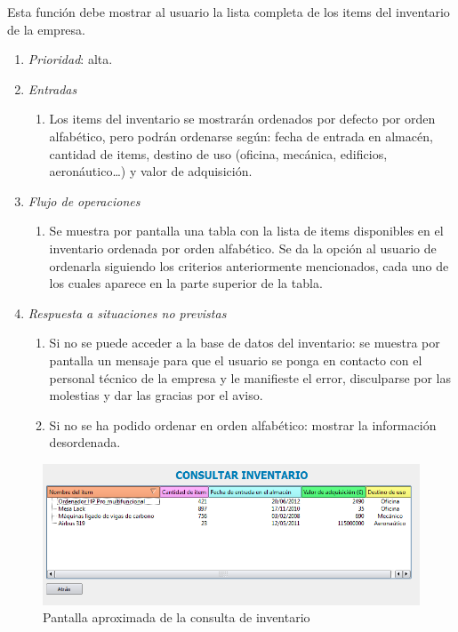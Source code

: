  \label{fun:consultarinventario}
	Esta función debe mostrar al usuario la lista completa de los items del inventario de la empresa.
		
	\begin{enumerate}
		\item \textit{Prioridad}: alta.
		\item \textit{Entradas}
			\begin{enumerate}
				\item Los items del inventario se mostrarán ordenados por defecto por orden alfabético, pero podrán ordenarse según: fecha de entrada en almacén, cantidad de items, destino de uso (oficina, mecánica, edificios, aeronáutico\ldots) y valor de adquisición.
			\end{enumerate}
		\item \textit{Flujo de operaciones}
			\begin{enumerate}
				\item Se muestra por pantalla una tabla con la lista de items disponibles en el inventario ordenada por orden alfabético. Se da la opción al usuario de ordenarla siguiendo los criterios anteriormente mencionados, cada uno de los cuales aparece en la parte superior de la tabla.																				\end{enumerate}
		\item \textit{Respuesta a situaciones no previstas}
			\begin{enumerate}
				\item Si no se puede acceder a la base de datos del inventario: se muestra por pantalla un mensaje para que el usuario se ponga en contacto con el personal técnico de la empresa y le manifieste el error, disculparse por las molestias y dar las gracias por el aviso.
				\item Si no se ha podido ordenar en orden alfabético: mostrar la información desordenada.
			\end{enumerate}
	\end{enumerate}
	
	\label{fun:ConsulInv}
	\begin{figure}[ht]\centering
	\includegraphics[scale=.6]{imagenes/consultarInventarioImagen.png}
	\caption{Pantalla aproximada de la consulta de inventario}
\end{figure}

								
